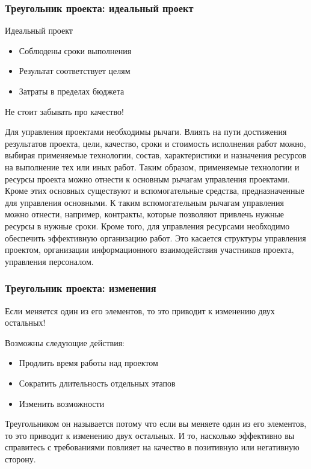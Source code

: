 \documentclass{../industrial-development}
\begin{document}
    \begin{frame} \frametitle{Треугольник проекта: идеальный проект}
        \begin{block}{Идеальный проект}
            \begin{itemize}
                \item Соблюдены сроки выполнения
                \item Результат соответствует целям
                \item Затраты в пределах бюджета
            \end{itemize}
        \end{block}
        \medskip
        Не стоит забывать про \alert{качество}!
    \end{frame}
    \lecturenotes

Для управления проектами необходимы рычаги. Влиять на пути достижения результатов проекта, цели, качество, сроки и стоимость исполнения работ можно, выбирая применяемые технологии, состав, характеристики и назначения ресурсов на выполнение тех или иных работ. Таким образом, применяемые технологии и ресурсы проекта можно отнести к основным рычагам управления проектами. Кроме этих основных существуют и вспомогательные средства, предназначенные для управления основными. К таким вспомогательным рычагам управления можно отнести, например, контракты, которые позволяют привлечь нужные ресурсы в нужные сроки. Кроме того, для управления ресурсами необходимо обеспечить эффективную организацию работ. Это касается структуры управления проектом, организации информационного взаимодействия участников проекта, управления персоналом.

    \begin{frame} \frametitle{Треугольник проекта: изменения}
	Если меняется один из его элементов, то это приводит к изменению двух остальных!

	Возможны следующие действия:
	\begin{itemize}
		\item Продлить время работы над проектом
		\item Сократить длительность отдельных этапов
		\item Изменить возможности
	\end{itemize}
    \end{frame}
    \lecturenotes

Треугольником он называется потому что если вы меняете один из его элементов, то это приводит к изменению двух остальных. И то, насколько эффективно вы справитесь с требованиями повлияет на качество в позитивную или негативную сторону.
\end{document}
